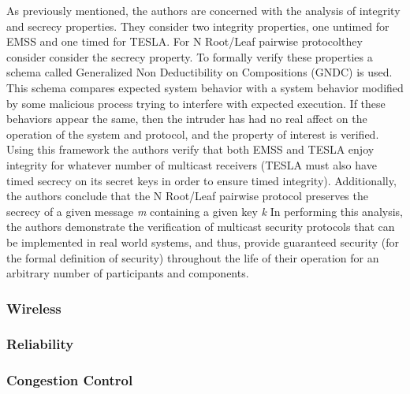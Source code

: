 \documentclass[12pt, fullpage]{article}
\begin{document}
As previously mentioned, the authors are concerned with the analysis of integrity and secrecy properties. They consider two integrity properties, one untimed for EMSS and one timed for \textmugreek TESLA. For N Root/Leaf pairwise protocolthey consider consider the secrecy property. To formally verify these properties a schema called Generalized Non Deductibility on Compositions (GNDC) is used. This schema compares expected system behavior with a system behavior modified by some malicious process trying to interfere with expected execution. If these behaviors appear the same, then the intruder has had no real affect on the operation of the system and protocol, and the property of interest is verified. Using this framework the authors verify that both EMSS and \textmugreek TESLA enjoy integrity for whatever number of multicast receivers (\textmugreek TESLA must also have timed secrecy on its secret keys in order to ensure timed integrity). Additionally, the authors conclude that the N Root/Leaf pairwise protocol preserves the secrecy of a given message \textit{m} containing a given key \textit{k}
\bigbreak
In performing this analysis, the authors demonstrate the verification of multicast security protocols that can be implemented in real world systems, and thus, provide guaranteed security (for the formal definition of security) throughout the life of their operation for an arbitrary number of participants and components.
\bigbreak
\subsubsection{Wireless}

\subsubsection{Reliability}

\subsubsection{Congestion Control}



\end{document}
